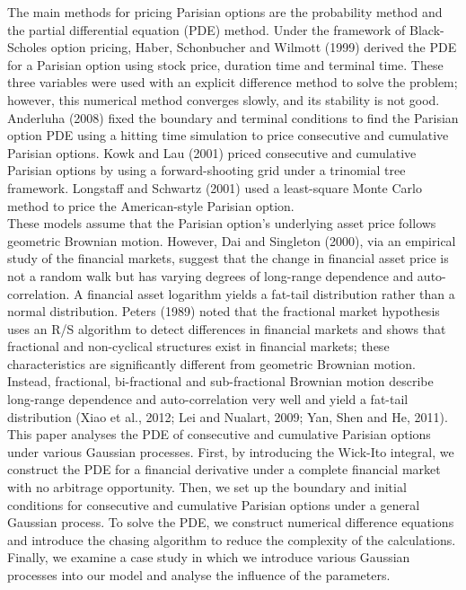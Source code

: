 \documentclass{ctexart} %
\begin{document}
The main methods for pricing Parisian options are the probability method and the partial differential equation (PDE) method. Under the framework of Black-Scholes option pricing, Haber, Schonbucher and Wilmott (1999) derived the PDE for a Parisian option using stock price, duration time and terminal time. These three variables were used with an explicit difference method to solve the problem; however, this numerical method converges slowly, and its stability is not good. Anderluha (2008) fixed the boundary and terminal conditions to find the Parisian option PDE using a hitting time simulation to price consecutive and cumulative Parisian options. Kowk and Lau (2001) priced consecutive and cumulative Parisian options by using a forward-shooting grid under a trinomial tree framework. Longstaff and Schwartz (2001) used a least-square Monte Carlo method to price the American-style Parisian option.\\

These models assume that the Parisian option’s underlying asset price follows geometric Brownian motion. However, Dai and Singleton (2000), via an empirical study of the financial markets, suggest that the change in financial asset price is not a random walk but has varying degrees of long-range dependence and auto-correlation. A financial asset logarithm yields a fat-tail distribution rather than a normal distribution. Peters (1989) noted that the fractional market hypothesis uses an R/S algorithm to detect differences in financial markets and shows that fractional and non-cyclical structures exist in financial markets; these characteristics are significantly different from geometric Brownian motion. Instead, fractional, bi-fractional and sub-fractional Brownian motion describe long-range dependence and auto-correlation very well and yield a fat-tail distribution (Xiao et al., 2012; Lei and Nualart, 2009; Yan, Shen and He, 2011). \\

This paper analyses the PDE of consecutive and cumulative Parisian options under various Gaussian processes. First, by introducing the Wick-Ito integral, we construct the PDE for a financial derivative under a complete financial market with no arbitrage opportunity. Then, we set up the boundary and initial conditions for consecutive and cumulative Parisian options under a general Gaussian process. To solve the PDE, we construct numerical difference equations and introduce the chasing algorithm to reduce the complexity of the calculations. Finally, we examine a case study in which we introduce various Gaussian processes into our model and analyse the influence of the parameters.
\end{document}
